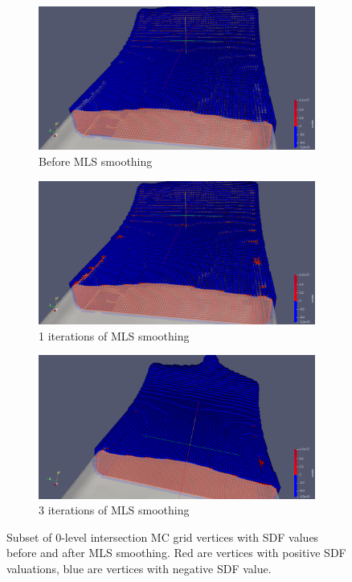 \begin{figure}[H]
	\begin{center}
		\begin{subfigure}[b]{0.9\textwidth}
			\includegraphics[width=\textwidth]{figures/IntersectionCellsSdfBeforeMls_1_iter.png}	
			\caption{Before MLS smoothing} \label{fig:mls_0_iter}
		\end{subfigure}
		\begin{subfigure}[b]{0.9\textwidth}
			\includegraphics[width=\textwidth]{ figures/IntersectionCellsSdfAfterMls_1_iter.png}	
			\caption{1 iterations of MLS smoothing} \label{fig:mls_1_iter}
		\end{subfigure}
		\begin{subfigure}[b]{0.9\textwidth}
			\includegraphics[width=\textwidth]{figures/IntersectionCellsSdfAfterMls_3_iter.png}	
			\caption{3 iterations of MLS smoothing} \label{fig:mls_3_iter}
		\end{subfigure}
	\end{center}
	\caption{Subset of 0-level intersection MC grid vertices with SDF values before and after MLS smoothing. Red are vertices with positive SDF valuations, blue are vertices with negative SDF value.} 
	\label{fig:mls_iterations}
\end{figure}
